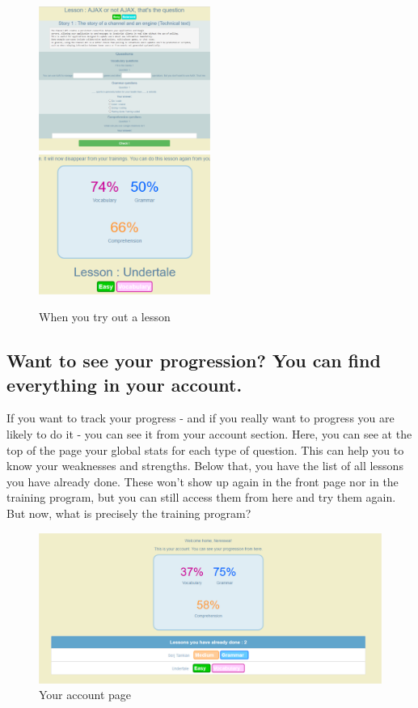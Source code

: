 \begin{figure}[H]
    \includegraphics[width=0.5\textwidth]{./images/trylesson.png}
    \includegraphics[width=0.5\textwidth]{./images/results.png}
    \caption{When you try out a lesson}
\end{figure}

\subsection{Want to see your progression? You can find everything in your account.}
If you want to track your progress - and if you really want to progress you are likely to do it - you can see it from your account section. \linebreak
Here, you can see at the top of the page your global stats for each type of question. This can help you to know your weaknesses and strengths. Below that, you have the list of all lessons you have already done. These won't show up again in the front page nor in the training program, but you can still access them from here and try them again. \linebreak
But now, what is precisely the training program?

\begin{figure}[H]
    \includegraphics[width=1\textwidth]{./images/account.png}
    \caption{Your account page}
\end{figure}

